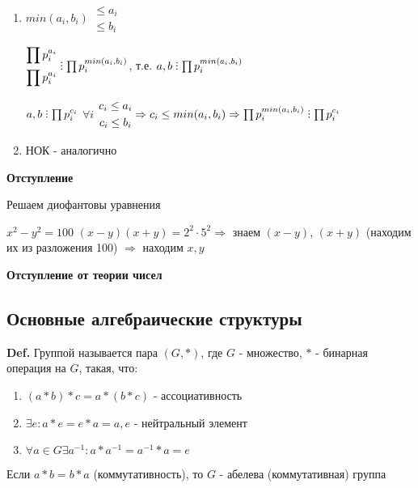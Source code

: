 \documentclass[14pt, letter paper]{article}
\DeclareRobustCommand{\divby}{%
  \mathrel{\text{\vbox{\baselineskip.65ex\lineskiplimit0pt\hbox{.}\hbox{.}\hbox{.}}}}%
}
\begin{document}
\begin{enumerate}
    \item $min(a_i, b_i) \begin{gathered} \leq a_i \\ \leq b_i \end{gathered}$

    $\begin{gathered} \prod p_i^{a_i} \\ \prod p_i^{a_i} \end{gathered} \divby \prod p_i^{min(a_i, b_i)}$, т.е. $a, b \divby \prod p_i^{min(a_i, b_i)}$

    $a, b \divby \prod p_i^{c_i}$ $\forall i$ $\begin{gathered} c_i \leq a_i \\ c_i \leq b_i \end{gathered} \Rightarrow c_i \leq min(a_i, b_i) \Rightarrow \prod p_i^{min(a_i, b_i)} \divby \prod p_i^{c_i}$

    \item НОК - аналогично
\end{enumerate}

\textbf{Отступление}

Решаем диофантовы уравнения

$x^2 - y^2 = 100$ $(x-y)(x+y) = 2^2 \cdot 5^2 \Rightarrow$ знаем $(x - y)$, $(x + y)$ (находим их из разложения 100) $\Rightarrow$ находим $x, y$

\textbf{Отступление от теории чисел}

\begin{center}
    \section*{Основные алгебраические структуры}
\end{center}

\textbf{Def.} Группой называется пара $(G, *)$, где $G$ - множество, $*$ - бинарная операция на $G$, такая, что:
\begin{enumerate}
    \item $(a * b) * c = a * (b * c)$ - ассоциативность
    \item $\exists e: a * e = e * a = a, e$ - нейтральный элемент
    \item $\forall a \in G \exists a^{-1}: a * a^{-1} = a^{-1} * a = e$
\end{enumerate}

Если $a * b = b * a$ (коммутативность), то $G$ - абелева (коммутативная) группа
\end{document}
